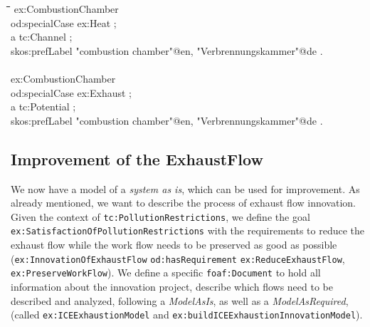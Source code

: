 \documentclass[a4paper,11pt]{article}
\newenvironment{code}{\tt \begin{tabbing}
\hskip12pt\=\hskip12pt\=\hskip12pt\=\hskip12pt\=\hskip5cm\=\hskip5cm\=\kill}
{\end{tabbing}}
\begin{document}
\begin{itemize}
    \begin{code}
    ex:CombustionChamber \\
    \> od:specialCase ex:Heat ; \\
    \> a tc:Channel ; \\
    \> skos:prefLabel "combustion chamber"@en, "Verbrennungskammer"@de . \\
    \\
    ex:CombustionChamber \\
    \> od:specialCase ex:Exhaust ; \\
    \> a tc:Potential ; \\
    \> skos:prefLabel "combustion chamber"@en, "Verbrennungskammer"@de . \\
    \end{code}

    \subsection{Improvement of the ExhaustFlow}
    We now have a model of a \emph{system as is}, which can be used for
    improvement. As already mentioned, we want to describe the process 
    of exhaust flow innovation. Given the context of 
    \texttt{tc:PollutionRestrictions}, 
    we define the goal \texttt{ex:SatisfactionOfPollutionRestrictions} with the
    requirements to reduce the exhaust flow while the work flow needs to be 
    preserved as good as possible (\texttt{ex:InnovationOfExhaustFlow} 
    \texttt{od:hasRequirement} \texttt{ex:ReduceExhaustFlow}, 
    \texttt{ex:PreserveWorkFlow}). We define a specific
    \texttt{foaf:Document} to hold all information about the innovation
    project, describe which flows need to be described and analyzed,
    following a \emph{ModelAsIs}, as well as a \emph{ModelAsRequired},
    (called \texttt{ex:ICEExhaustionModel} and \newline
    \texttt{ex:buildICEExhaustionInnovationModel}).


\end{itemize}
\end{document}
